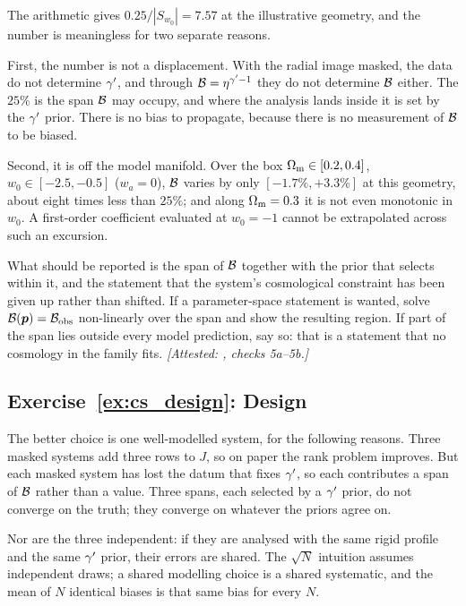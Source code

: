 The arithmetic gives $0.25/|S_{w_0}|=7.57$ at the illustrative geometry,
and the number is meaningless for two separate reasons.

First, the number is not a displacement. With the radial image masked, the data
do not determine $\gamma'$, and through $\mathcal{B}=\eta^{\gamma'-1}$ they do not
determine $\mathcal{B}$ either. The $25\%$ is the span $\mathcal{B}$ may occupy, and
where the analysis lands inside it is set by the $\gamma'$ prior. There is
no bias to propagate, because there is no measurement of $\mathcal{B}$ to be
biased.

Second, it is off the model manifold. Over the box
$\Omega_{\mathrm{m}}\in[0.2,0.4]$, $w_0\in[-2.5,-0.5]$ ($w_a=0$), $\mathcal{B}$ varies by
only $[-1.7\%,+3.3\%]$ at this geometry, about eight times less than
$25\%$; and along $\Omega_{\mathrm{m}}=0.3$ it is not even monotonic in $w_0$. A
first-order coefficient evaluated at $w_0=-1$ cannot be extrapolated
across such an excursion.

What should be reported is the span of $\mathcal{B}$ together with the prior
that selects within it, and the statement that the system's cosmological
constraint has been given up rather than shifted. If a parameter-space
statement is wanted, solve $\mathcal{B}(\bm{p})=\mathcal{B}_{\rm obs}$ non-linearly
over the span and show the resulting region. If part of the span lies
outside every model prediction, say so: that is a statement that no
cosmology in the family fits.
\emph{[Attested: , checks 5a--5b.]}

\subsection*{Exercise~\ref{ex:cs_design}: Design}

The better choice is one well-modelled system, for the following
reasons. Three masked systems add three rows to $J$, so on paper
the rank problem improves. But each masked system has lost the datum that
fixes $\gamma'$, so each contributes a span of $\mathcal{B}$ rather than a value.
Three spans, each selected by a $\gamma'$ prior, do not converge on the
truth; they converge on whatever the priors agree on.

Nor are the three independent: if they are analysed with the same rigid
profile and the same $\gamma'$ prior, their errors are shared. The
$\sqrt N$ intuition assumes independent draws; a shared modelling choice
is a shared systematic, and the mean of $N$ identical biases is that
same bias for every $N$.

